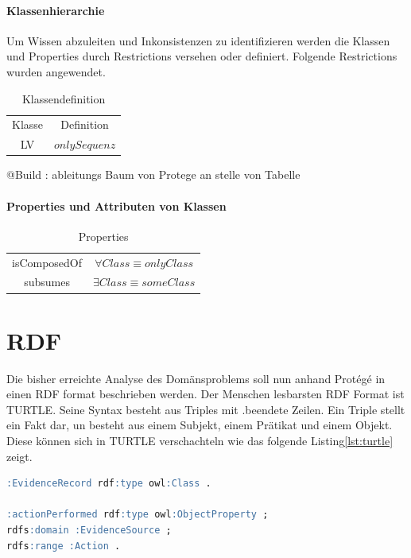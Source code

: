 \documentclass[
12pt,
english,
ngerman,
headsepline,
twoside,
openright,
numbers=noenddot,version=first
]{scrreprt}
\providecommand{\tabularnewline}{\\}
\begin{document}
\paragraph{Klassenhierarchie}
Um Wissen abzuleiten und Inkonsistenzen zu identifizieren werden die Klassen und Properties durch Restrictions versehen oder definiert. Folgende Restrictions wurden angewendet.
\begin{table}[H]
\caption{Klassendefinition}

\noindent \centering{}\begin{tabular}{cc}
\hline
\noalign{\vskip\doublerulesep}
Klasse & Definition \tabularnewline[\doublerulesep]
\noalign{\vskip\doublerulesep}
LV & $only Sequenz$ \tabularnewline[\doublerulesep]
\end{tabular}
\end{table}

@Build : ableitungs Baum von Protege an stelle von Tabelle

\paragraph{Properties und Attributen von Klassen}

\begin{table}[H]
\caption{Properties}\label{tab:prop}

\noindent \centering{}\begin{tabular}{cc}
\hline
\noalign{\vskip\doublerulesep}
isComposedOf & $\forall{Class} \equiv only Class$ \tabularnewline[\doublerulesep]
\noalign{\vskip\doublerulesep}
subsumes & $\exists{Class} \equiv some Class$ \tabularnewline[\doublerulesep]
\end{tabular}
\end{table}


\section{RDF}

Die bisher erreichte Analyse des Domänsproblems soll nun anhand Protégé in einen RDF format beschrieben werden. Der Menschen lesbarsten RDF Format ist TURTLE. Seine Syntax besteht aus Triples mit \glqq .\grqq beendete Zeilen. Ein Triple stellt ein Fakt dar, un besteht aus einem Subjekt, einem Prätikat und einem Objekt. Diese können sich in TURTLE verschachteln wie das folgende Listing\ref{lst:turtle} zeigt.

\begin{lstlisting}[language=SQL,caption={Darstellung von Triples in TURTLE},label={lst:turtle}]
:EvidenceRecord rdf:type owl:Class .

:actionPerformed rdf:type owl:ObjectProperty ;
rdfs:domain :EvidenceSource ;
rdfs:range :Action .
\end{lstlisting}
\end{document}
